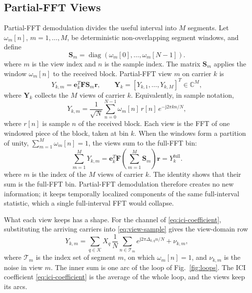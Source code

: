 \documentclass[conference]{IEEEtran}
\newcommand{\C}{\mathbb{C}}
\newcommand{\Kset}{\mathcal{K}}
\begin{document}
\subsection{Partial-FFT Views}

Partial-FFT demodulation divides the useful interval into \(M\) segments.
Let \(\omega_m[n]\), \(m=1,\ldots,M\), be deterministic non-overlapping
segment windows, and define
\begin{equation}
  \mathbf S_m
  =
  \operatorname{diag}\!\left(\omega_m[0],\ldots,\omega_m[N-1]\right).
  \label{eq:segment}
\end{equation}
where \(m\) is the view index and \(n\) is the sample index.  The matrix
\(\mathbf S_m\) applies the window \(\omega_m[n]\) to the received block.
Partial-FFT view \(m\) on carrier \(k\) is
\begin{equation}
  Y_{k,m}
  =
  \mathbf e_k^{T}\mathbf F\mathbf S_m\mathbf r,
  \qquad
  \mathbf Y_k
  =
  [Y_{k,1},\ldots,Y_{k,M}]^T\in\C^M,
  \label{eq:view}
\end{equation}
where \(\mathbf Y_k\) collects the \(M\) views of carrier \(k\).
Equivalently, in sample notation,
\begin{equation}
  Y_{k,m}
  =
  \frac{1}{\sqrt N}\sum_{n=0}^{N-1}
  \omega_m[n]\,r[n]\,e^{-\mathrm j2\pi kn/N},
  \label{eq:view-sample}
\end{equation}
where \(r[n]\) is sample \(n\) of the received block.  Each view is the
FFT of one windowed piece of the block, taken at bin \(k\).  When the
windows form a partition of unity, \(\sum_{m=1}^{M}\omega_m[n]=1\), the
views sum to the full-FFT bin:
\begin{equation}
  \sum_{m=1}^{M}Y_{k,m}
  =
  \mathbf e_k^T\mathbf F
  \left(\sum_{m=1}^{M}\mathbf S_m\right)\mathbf r
  =
  Y_k^{\mathrm{full}}.
  \label{eq:view-identity}
\end{equation}
where \(m\) is the index of the \(M\) views of carrier \(k\).  The identity shows
that their sum is the full-FFT bin.
Partial-FFT demodulation therefore creates no new information; it keeps
temporally localized components of the same full-interval statistic, which a
single full-interval FFT would collapse.

What each view keeps has a shape.  For the channel of
\eqref{eq:ici-coefficient}, substituting the arriving carriers into
\eqref{eq:view-sample} gives the view-domain row
\begin{equation}
  Y_{k,m}
  =
  \sum_{q\in\Kset}
  X_q\,
  \frac{1}{N}\sum_{n\in\mathcal T_m}
  e^{\mathrm j2\pi\Delta_{k,q}n/N}
  +\nu_{k,m},
  \label{eq:view-row}
\end{equation}
where \(\mathcal T_m\) is the index set of segment \(m\), on which
\(\omega_m[n]=1\), and \(\nu_{k,m}\) is the noise in view \(m\).  The inner
sum is one arc
of the loop of Fig.~\ref{fig:loops}.  The ICI coefficient
\eqref{eq:ici-coefficient} is the average of the whole loop, and the views
keep its arcs.
\end{document}
